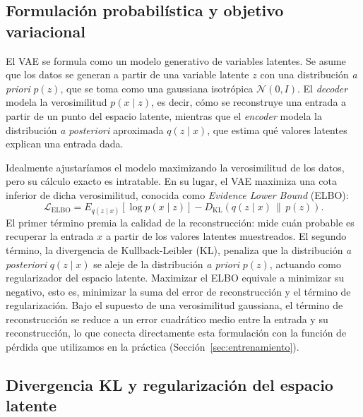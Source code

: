 \documentclass[12pt,a4paper,twoside]{tesis}
\begin{document}
\subsection{Formulación probabilística y objetivo variacional}

El VAE se formula como un modelo generativo de variables latentes. Se asume que los datos se generan a partir de una variable latente $z$ con una distribución \textit{a priori} $p(z)$, que se toma como una gaussiana isotrópica $\mathcal{N}(0, I)$. El \textit{decoder} modela la verosimilitud $p(x \mid z)$, es decir, cómo se reconstruye una entrada a partir de un punto del espacio latente, mientras que el \textit{encoder} modela la distribución \textit{a posteriori} aproximada $q(z \mid x)$, que estima qué valores latentes explican una entrada dada.

Idealmente ajustaríamos el modelo maximizando la verosimilitud de los datos, pero su cálculo exacto es intratable. En su lugar, el VAE maximiza una cota inferior de dicha verosimilitud, conocida como \textit{Evidence Lower Bound} (ELBO):
\begin{equation}
\mathcal{L}_{\mathrm{ELBO}} = E_{q(z \mid x)}\!\left[\log p(x \mid z)\right] - D_{\mathrm{KL}}\!\left(q(z \mid x)\,\|\,p(z)\right).
\end{equation}
El primer término premia la calidad de la reconstrucción: mide cuán probable es recuperar la entrada $x$ a partir de los valores latentes muestreados. El segundo término, la divergencia de Kullback-Leibler (KL), penaliza que la distribución \textit{a posteriori} $q(z \mid x)$ se aleje de la distribución \textit{a priori} $p(z)$, actuando como regularizador del espacio latente. Maximizar el ELBO equivale a minimizar su negativo, esto es, minimizar la suma del error de reconstrucción y el término de regularización. Bajo el supuesto de una verosimilitud gaussiana, el término de reconstrucción se reduce a un error cuadrático medio entre la entrada y su reconstrucción, lo que conecta directamente esta formulación con la función de pérdida que utilizamos en la práctica (Sección~\ref{sec:entrenamiento}).

\subsection{Divergencia KL y regularización del espacio latente}
\end{document}
